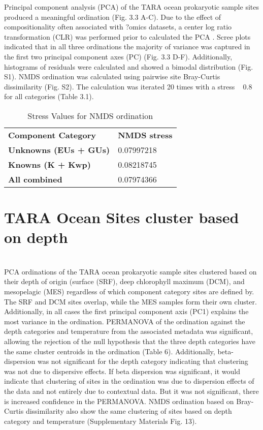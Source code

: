 Principal component analysis (PCA) of the TARA ocean prokaryotic sample sites produced a meaningful ordination (Fig. 3.3 A-C). Due to the effect of compositionality often associated with ?omics datasets, a center log ratio transformation (CLR) was performed prior to calculated the PCA \citep{Gloor_2017}. Scree plots indicated that in all three ordinations the majority of variance was captured in the first two principal component axes (PC) (Fig. 3.3 D-F). Additionally, histograms of residuals were calculated and showed a bimodal distribution (Fig. S1). NMDS ordination was calculated using pairwise site Bray-Curtis dissimilarity (Fig. S2). The calculation was iterated 20 times with a stress ~ 0.8 for all categories (Table 3.1).

\begin{table}[]
\centering
\caption{Stress Values for NMDS ordination}
\label{my-label}
\begin{tabular}{ll}
\textbf{Component Category}   & \textbf{NMDS stress} \\
\textbf{Unknowns (EUs + GUs)} & 0.07997218           \\
\textbf{Knowns (K + Kwp)}     & 0.08218745           \\
\textbf{All combined}         & 0.07974366          
\end{tabular}
\end{table}

\section{TARA Ocean Sites cluster based on depth}\\

PCA ordinations of the TARA ocean prokaryotic sample sites clustered based on their depth of origin (surface (SRF), deep chlorophyll maximum (DCM), and mesopelagic (MES) regardless of which component category sites are defined by. The SRF and DCM sites overlap, while the MES samples form their own cluster. Additionally, in all cases the first principal component axis (PC1) explains the most variance in the ordination. PERMANOVA of the ordination against the depth categories and temperature from the associated metadata was significant, allowing the rejection of the null hypothesis that the three depth categories have the same cluster centroids in the ordination (Table 6). Additionally, beta-dispersion was not significant for the depth category indicating that clustering was not due to dispersive effects. If beta dispersion was significant, it would indicate that clustering of sites in the ordination was due to dispersion effects of the data and not entirely due to contextual data. But it was not significant, there is increased confidence in the PERMANOVA. NMDS ordination based on Bray-Curtis dissimilarity also show the same clustering of sites based on depth category and temperature (Supplementary Materials Fig. 13). \\

